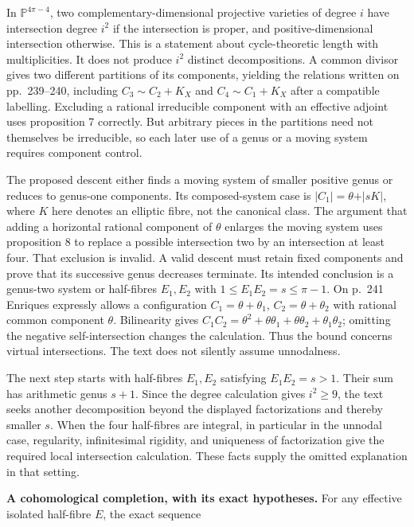 In \(\mathbb P^{4\pi-4}\), two complementary-dimensional projective varieties of degree \(i\) have intersection degree \(i^2\) if the intersection is proper, and positive-dimensional intersection otherwise. This is a statement about cycle-theoretic length with multiplicities. It does not produce \(i^2\) distinct decompositions. A common divisor gives two different partitions of its components, yielding the relations written on pp.~239--240, including \(C_3\sim C_2+K_X\) and \(C_4\sim C_1+K_X\) after a compatible labelling. Excluding a rational irreducible component with an effective adjoint uses proposition 7 correctly. But arbitrary pieces in the partitions need not themselves be irreducible, so each later use of a genus or a moving system requires component control.

The proposed descent either finds a moving system of smaller positive genus or reduces to genus-one components. Its composed-system case is \(\vert C_1\vert=\theta+\vert sK\vert\), where \(K\) here denotes an elliptic fibre, not the canonical class. The argument that adding a horizontal rational component of \(\theta\) enlarges the moving system uses proposition 8 to replace a possible intersection two by an intersection at least four. That exclusion is invalid. A valid descent must retain fixed components and prove that its successive genus decreases terminate. Its intended conclusion is a genus-two system or half-fibres \(E_1,E_2\) with \(1\le E_1E_2=s\le\pi-1\). On p.~241 Enriques expressly allows a configuration \(C_1=\theta+\theta_1\), \(C_2=\theta+\theta_2\) with rational common component \(\theta\). Bilinearity gives \(C_1C_2=\theta^2+\theta\theta_1+\theta\theta_2+\theta_1\theta_2\); omitting the negative self-intersection changes the calculation. Thus the bound concerns virtual intersections. The text does not silently assume unnodalness.

The next step starts with half-fibres \(E_1,E_2\) satisfying \(E_1E_2=s>1\). Their sum has arithmetic genus \(s+1\). Since the degree calculation gives \(i^2\ge9\), the text seeks another decomposition beyond the displayed factorizations and thereby smaller \(s\). When the four half-fibres are integral, in particular in the unnodal case, regularity, infinitesimal rigidity, and uniqueness of factorization give the required local intersection calculation. These facts supply the omitted explanation in that setting.

\textbf{A cohomological completion, with its exact hypotheses.} For any effective isolated half-fibre \(E\), the exact sequence

